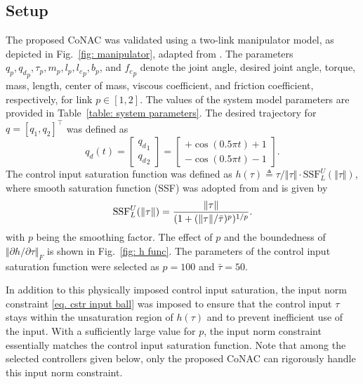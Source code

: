 \documentclass[lettersize,journal]{IEEEtran}
\begin{document}
\subsection{Setup}

The proposed CoNAC was validated using a two-link manipulator model, as depicted in Fig.~\ref{fig: manipulator}, adapted from \cite{RN32}. 
The parameters $q_p,{q_d}_p,\tau_p,m_p,l_p,{l_c}_p,b_p$, and ${f_c}_p$ denote the joint angle, desired joint angle, torque, mass, length, center of mass, viscous coefficient, and friction coefficient, respectively, for link $p\in[1,2]$.
The values of the system model parameters are provided in Table~\ref{table: system parameters}. The desired trajectory for ${q}=[q_1,q_2]^\top$ was defined as
\begin{equation}
    {q_d}(t) = 
    \begin{bmatrix}
        {q_d}_1\\{q_d}_2
    \end{bmatrix}
    =
    \begin{bmatrix}
        +\cos(0.5\pi t) + 1 \\
        -\cos(0.5\pi t) - 1 
    \end{bmatrix}.
\end{equation}
The control input saturation function was defined as $h(\tau)\triangleq \tau/\Vert\tau\Vert \cdot \text{SSF}_L^U(\Vert\tau\Vert)$, where smooth saturation function (SSF) was adopted from \cite{RN28} and is given by
\begin{equation}
    \text{SSF}_L^U(\Vert\tau\Vert) = {\Vert\tau\Vert\over (1+(\Vert\tau\Vert/\bar\tau)^p)^{1/p}}.
    \label{eq. h func}
\end{equation}
with $p$ being the smoothing factor. The effect of $p$ and the boundedness of $\Vert\partial h/\partial \tau\Vert_F$ is shown in Fig.~\ref{fig: h func}.
The parameters of the control input saturation function were selected as $p=100$ and $\bar\tau=50$. 

In addition to this physically imposed control input saturation, the input norm constraint \eqref{eq. cstr input ball} was imposed to ensure that the control input $\tau$ stays within the unsaturation region of $h(\tau)$ and to prevent inefficient use of the input. With a sufficiently large value for $p$, the input norm constraint essentially matches the control input saturation function. Note that among the selected controllers given below, only the proposed CoNAC can rigorously handle this input norm constraint.
\end{document}
